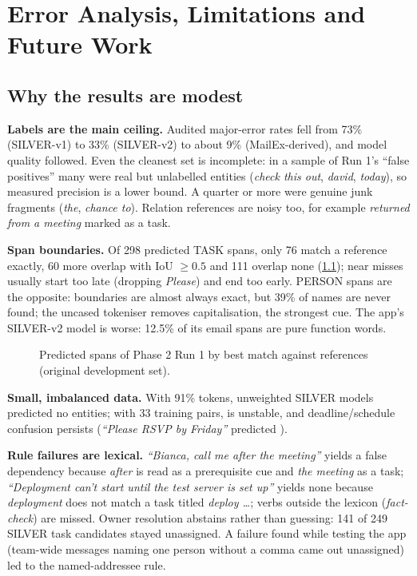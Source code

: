 \chapter{Error Analysis, Limitations and Future Work}
\label{ch:discussion}

\section{Why the results are modest}
\textbf{Labels are the main ceiling.} Audited major-error rates fell from 73\% (SILVER-v1) to 33\% (SILVER-v2) to about 9\% (MailEx-derived), and model quality followed. Even the cleanest set is incomplete: in a sample of Run 1's ``false positives'' many were real but unlabelled entities (\emph{check this out}, \emph{david}, \emph{today}), so measured precision is a lower bound. A quarter or more were genuine junk fragments (\emph{the}, \emph{chance to}). Relation references are noisy too, for example \emph{returned from a meeting} marked as a task.

\textbf{Span boundaries.} Of 298 predicted TASK spans, only 76 match a reference exactly, 60 more overlap with IoU $\ge0.5$ and 111 overlap none (\cref{fig:anatomy}); near misses usually start too late (dropping \emph{Please}) and end too early. PERSON spans are the opposite: boundaries are almost always exact, but 39\% of names are never found; the uncased tokeniser removes capitalisation, the strongest cue. The app's SILVER-v2 model is worse: 12.5\% of its email spans are pure function words.

\begin{figure}[htbp]
\centering
{}
\caption{Predicted spans of Phase 2 Run 1 by best match against references (original development set).}
\label{fig:anatomy}
\end{figure}

\textbf{Small, imbalanced data.} With 91\%  tokens, unweighted SILVER models predicted no entities; with 33 training pairs,  is unstable, and deadline/schedule confusion persists (\emph{``Please RSVP by Friday''} predicted ).

\textbf{Rule failures are lexical.} \emph{``Bianca, call me after the meeting''} yields a false dependency because \emph{after} is read as a prerequisite cue and \emph{the meeting} as a task; \emph{``Deployment can't start until the test server is set up''} yields none because \emph{deployment} does not match a task titled \emph{deploy \ldots}; verbs outside the lexicon (\emph{fact-check}) are missed. Owner resolution abstains rather than guessing: 141 of 249 SILVER task candidates stayed unassigned. A failure found while testing the app (team-wide messages naming one person without a comma came out unassigned) led to the named-addressee rule.

